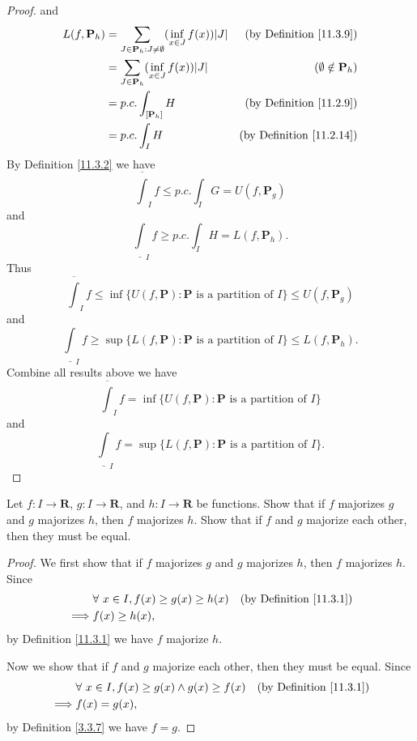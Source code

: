 \begin{proof}
    and
    \begin{align*}
        L(f, \mathbf{P}_h) & = \sum_{J \in \mathbf{P}_h : J \neq \emptyset} (\inf_{x \in J} f(x)) \abs*{J} & \text{(by Definition \ref{11.3.9})} \\
        & = \sum_{J \in \mathbf{P}_h} (\inf_{x \in J} f(x)) \abs*{J} & (\emptyset \notin \mathbf{P}_h) \\
        & = p.c. \int_{[\mathbf{P}_h]} H & \text{(by Definition \ref{11.2.9})} \\
        & = p.c. \int_I H & \text{(by Definition \ref{11.2.14})}
    \end{align*}
    By Definition \ref{11.3.2} we have
    \[
        \overline{\int}_I f \leq p.c. \int_I G = U(f, \mathbf{P}_g)
    \]
    and
    \[
        \underline{\int}_I f \geq p.c. \int_I H = L(f, \mathbf{P}_h).
    \]
    Thus
    \[
        \overline{\int}_I f \leq \inf \{U(f, \mathbf{P}) : \mathbf{P} \text{ is a partition of } I\} \leq U(f, \mathbf{P}_g)
    \]
    and
    \[
        \underline{\int}_I f \geq \sup \{L(f, \mathbf{P}) : \mathbf{P} \text{ is a partition of } I\} \leq L(f, \mathbf{P}_h).
    \]
    Combine all results above we have
    \[
        \overline{\int}_I f = \inf \{U(f, \mathbf{P}) : \mathbf{P} \text{ is a partition of } I\}
    \]
    and
    \[
        \underline{\int}_I f = \sup \{L(f, \mathbf{P}) : \mathbf{P} \text{ is a partition of } I\}.
    \]
\end{proof}

\exercisesection

\begin{exercise}\label{ex 11.3.1}
    Let \(f : I \to \mathbf{R}\), \(g : I \to \mathbf{R}\), and \(h : I \to \mathbf{R}\) be functions.
    Show that if \(f\) majorizes \(g\) and \(g\) majorizes \(h\), then \(f\) majorizes \(h\).
    Show that if \(f\) and \(g\) majorize each other, then they must be equal.
\end{exercise}

\begin{proof}
    We first show that if \(f\) majorizes \(g\) and \(g\) majorizes \(h\), then \(f\) majorizes \(h\).
    Since
    \begin{align*}
        & \forall\ x \in I, f(x) \geq g(x) \geq h(x) & \text{(by Definition \ref{11.3.1})} \\
        \implies & f(x) \geq h(x),
    \end{align*}
    by Definition \ref{11.3.1} we have \(f\) majorize \(h\).

    Now we show that if \(f\) and \(g\) majorize each other, then they must be equal.
    Since
    \begin{align*}
        & \forall\ x \in I, f(x) \geq g(x) \land g(x) \geq f(x) & \text{(by Definition \ref{11.3.1})} \\
        \implies & f(x) = g(x),
    \end{align*}
    by Definition \ref{3.3.7} we have \(f = g\).
\end{proof}

